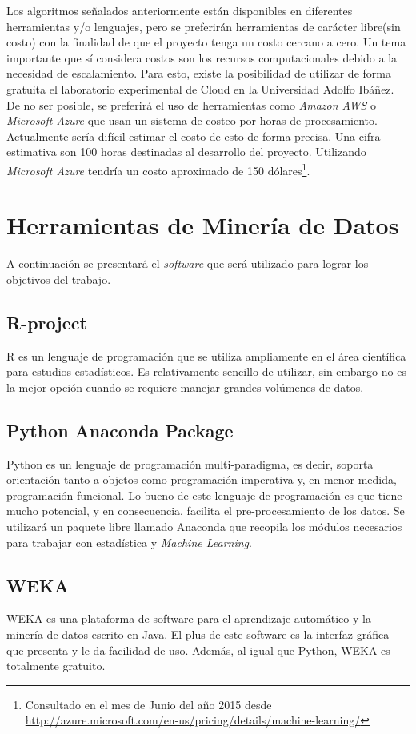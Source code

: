 Los algoritmos señalados anteriormente están disponibles en diferentes  herramientas y/o lenguajes, pero se preferirán herramientas de carácter libre(sin costo) con la finalidad de que el proyecto tenga un costo cercano a cero. Un tema importante que sí considera costos son los recursos computacionales debido a la necesidad de escalamiento. Para esto, existe la posibilidad de utilizar de forma gratuita el laboratorio experimental de Cloud en la Universidad Adolfo Ibáñez. De no ser posible, se preferirá el uso de herramientas como \textit{Amazon AWS} o \textit{Microsoft Azure} que usan un sistema de costeo por horas de procesamiento. Actualmente sería difícil estimar el costo de esto de forma precisa. Una cifra estimativa son 100 horas destinadas al desarrollo del proyecto. Utilizando \textit{Microsoft Azure} tendría un costo aproximado de 150 dólares\footnote{Consultado en el mes de Junio del año 2015 desde \url{http://azure.microsoft.com/en-us/pricing/details/machine-learning/}}.

\section{Herramientas de Minería de Datos}
A continuación se presentará el \textit{software} que será utilizado para lograr los objetivos del trabajo.
\subsection{R-project\cite{rproject}}
R es un lenguaje de programación que se utiliza ampliamente en el área científica para estudios estadísticos. Es relativamente sencillo de utilizar, sin embargo no es la mejor opción cuando se requiere manejar grandes volúmenes de datos.
\subsection{Python Anaconda Package\cite{python}}
Python es un lenguaje de programación multi-paradigma, es decir, soporta orientación tanto a objetos como programación imperativa y, en menor medida, programación funcional.
Lo bueno de este lenguaje de programación es que tiene mucho potencial, y en consecuencia, facilita el pre-procesamiento de los datos.
Se utilizará un paquete libre llamado Anaconda que recopila los módulos necesarios para trabajar con estadística y \textit{Machine Learning}.
\subsection{WEKA\cite{weka}}
WEKA es una plataforma de software para el aprendizaje automático y la minería de datos escrito en Java.
El plus de este software es la interfaz gráfica que presenta y le da facilidad de uso. Además, al igual que Python, WEKA es totalmente gratuito.
